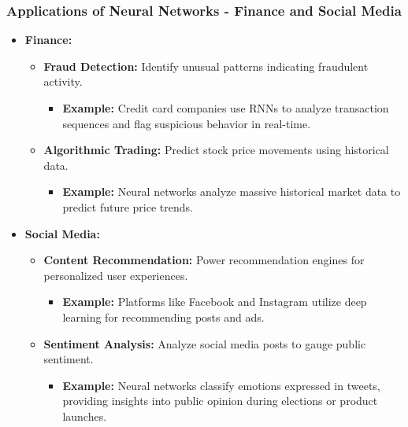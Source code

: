 \documentclass[aspectratio=169]{beamer}
\begin{document}
\begin{frame}[fragile]
  \frametitle{Applications of Neural Networks - Finance and Social Media}
  \begin{itemize}
      \item \textbf{Finance:}
      \begin{itemize}
          \item \textbf{Fraud Detection:} Identify unusual patterns indicating fraudulent activity.
          \begin{itemize}
              \item \textbf{Example:} Credit card companies use RNNs to analyze transaction sequences and flag suspicious behavior in real-time.
          \end{itemize}
          
          \item \textbf{Algorithmic Trading:} Predict stock price movements using historical data.
          \begin{itemize}
              \item \textbf{Example:} Neural networks analyze massive historical market data to predict future price trends.
          \end{itemize}
      \end{itemize}

      \item \textbf{Social Media:}
      \begin{itemize}
          \item \textbf{Content Recommendation:} Power recommendation engines for personalized user experiences.
          \begin{itemize}
              \item \textbf{Example:} Platforms like Facebook and Instagram utilize deep learning for recommending posts and ads.
          \end{itemize}

          \item \textbf{Sentiment Analysis:} Analyze social media posts to gauge public sentiment.
          \begin{itemize}
              \item \textbf{Example:} Neural networks classify emotions expressed in tweets, providing insights into public opinion during elections or product launches.
          \end{itemize}
      \end{itemize}
  \end{itemize}
\end{frame}
\end{document}
